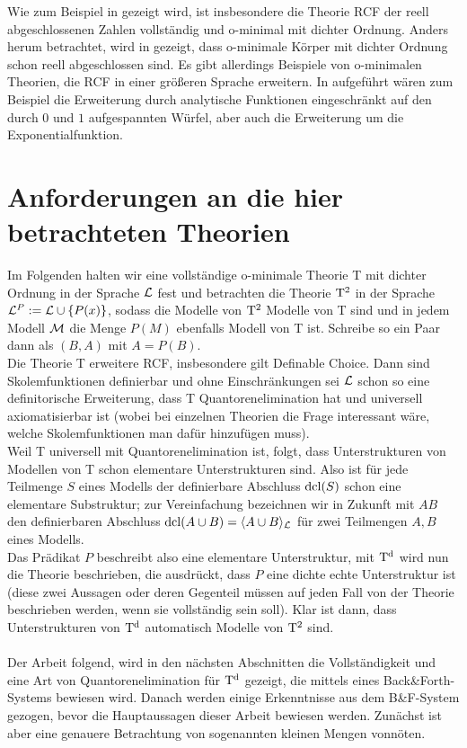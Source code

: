 \begin{fact}
	Wie zum Beispiel in \cite{Marker} gezeigt wird, ist insbesondere die Theorie RCF der reell abgeschlossenen Zahlen vollständig und o-minimal mit dichter Ordnung.  Anders herum betrachtet, wird in \cite{Pillay} gezeigt, dass o-minimale Körper mit dichter Ordnung schon reell abgeschlossen sind. Es gibt allerdings Beispiele von o-minimalen Theorien, die RCF in einer größeren Sprache erweitern. In \cite{Wilkie} aufgeführt wären zum Beispiel die Erweiterung durch analytische Funktionen eingeschränkt auf den durch $0$ und $1$ aufgespannten Würfel, aber auch die Erweiterung um die Exponentialfunktion.
\end{fact}

\newpage
\section{Anforderungen an die hier betrachteten Theorien}

Im Folgenden halten wir eine vollständige o-minimale Theorie T mit dichter Ordnung in der Sprache $\mathcal{L}$ fest und betrachten die Theorie $\operatorname{T^2}$ in der Sprache $\mathcal{L}^P:=\mathcal{L}\cup\{P(x)\}$, sodass die Modelle von $\operatorname{T^2}$ Modelle von T sind und in jedem Modell $\mathcal{M}$ die Menge $P(M)$ ebenfalls Modell von T ist. Schreibe so ein Paar dann als $(B,A)$ mit $A=P(B)$.\\
Die Theorie T erweitere RCF, insbesondere gilt Definable Choice. Dann sind Skolemfunktionen definierbar und ohne Einschränkungen sei $\mathcal{L}$ schon so eine definitorische Erweiterung, dass T Quantorenelimination hat und universell axiomatisierbar ist (wobei bei einzelnen Theorien die Frage interessant wäre, welche Skolemfunktionen man dafür hinzufügen muss).\\
Weil T universell mit Quantorenelimination ist, folgt, dass Unterstrukturen von Modellen von T schon elementare Unterstrukturen sind. Also ist für jede Teilmenge $S$ eines Modells der definierbare Abschluss $\operatorname{dcl}(S)$ schon eine elementare Substruktur; zur Vereinfachung bezeichnen wir in Zukunft mit $AB$ den definierbaren Abschluss $\operatorname{dcl}(A\cup B)=\langle A\cup B\rangle_{\mathcal{L}}$ für zwei Teilmengen $A,B$ eines Modells.\\
Das Prädikat $P$ beschreibt also eine elementare Unterstruktur, mit $\operatorname{T^d}$ wird nun die Theorie beschrieben, die ausdrückt, dass $P$ eine dichte echte Unterstruktur ist (diese zwei Aussagen oder deren Gegenteil müssen auf jeden Fall von der Theorie beschrieben werden, wenn sie vollständig sein soll). Klar ist dann, dass Unterstrukturen von $\operatorname{T^d}$ automatisch Modelle von $\operatorname{T^2}$ sind.\\\\
Der Arbeit \cite{VanDenDries} folgend, wird in den nächsten Abschnitten die Vollständigkeit und eine Art von Quantorenelimination für $\operatorname{T^d}$ gezeigt, die mittels eines Back\&Forth-Systems bewiesen wird. Danach werden einige Erkenntnisse aus dem B\&F-System gezogen, bevor die Hauptaussagen dieser Arbeit bewiesen werden. Zunächst ist aber eine genauere Betrachtung von sogenannten kleinen Mengen vonnöten.
\newpage
